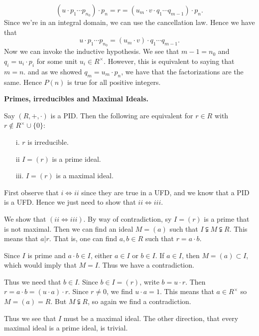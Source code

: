 \begin{prf}
\begin{description}
\begin{itemize}
\[                (u \cdot p_1 \cdots p_{n_0}) \cdot p_n
                = 
                r
                = 
                (u_m\cdot v \cdot  q_1 \cdots q_{m-1})\cdot p_n.
            \]
            Since we're in an integral domain, we can use the
            cancellation law. Hence we have that 
            \[
                u\cdot p_1 \cdots p_{n_0} = (u_m \cdot v)\cdot q_1 \cdots q_{m-1}.  
            \]
            Now we can invoke the inductive hypothesis. We see
            that $m - 1 = n_0$  and $q_i = u_i \cdot p_i$ for some
            unit $u_i \in R^{\times}$. However, this is equivalent
            to saying that $m = n$. and as we showed $q_m = u_m
            \cdot p_n$, we have that the factorizations are the
            same. Hence $P(n)$ is true for all positive integers. 
        \end{itemize}
    \end{description}
\end{prf}

\textbf{Primes, irreducibles and Maximal Ideals.}\\
\begin{proposition}
    Say $(R, +, \cdot)$ is a PID. Then the following are
    equivalent for  $r \in R$ with $r \not\in
    R^{\times}\cup\{0\}$:
    \begin{itemize}
        \item[i.] $r$ is irreducible.
        \item[ii] $I = (r)$ is a prime ideal.
        \item[iii.] $I=(r)$ is a maximal ideal.   
    \end{itemize}
\end{proposition}

\begin{prf}
    First observe that $i \iff ii$ since they are true in a UFD,
    and we know that a PID is a UFD. Hence we just need to show
    that $ii \iff iii$. 

    We show that $(ii \iff iii)$. By way of contradiction, sy $I =
    (r)$ is a prime that is not maximal. Then we can find an ideal
    $M = (a)$ such that $I \subsetneqq M \subsetneqq R$. This
    means that $a | r$. That is, one can find $a, b \in R$ such
    that $r = a\cdot b$. 

    Since $I$ is prime and $a \cdot b \in  I$, either $a \in I$ or
    $b \in I$. If $a \in I$, then $M = (a) \subset I$, which would
    imply that $M = I$. Thus we have a contradiction. 

    Thus we need that $b \in I$. Since $b \in I = (r)$, write $b =
    u \cdot r$. Then $r = a \cdot b = (u \cdot a) \cdot r$. Since
    $r \ne 0$, we find $u \cdot a = 1$. This means that $a \in
    R^\times$ so $M = (a) = R$. But $M \subsetneqq R$, so again we
    find a contradiction.

    Thus we see that $I$ must be a maximal ideal. The other
    direction, that every maximal ideal is a prime ideal, is trivial.
\end{prf}

